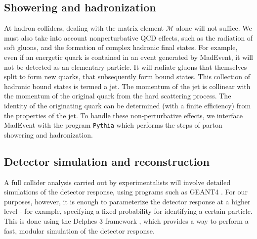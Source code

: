 \subsection{Showering and hadronization}
At hadron colliders, dealing with the matrix element $\mathcal{M}$ alone will not suffice. We must also take into account nonperturbative QCD effects, such as the radiation of soft gluons, and the formation of complex hadronic final states. For example, even if an energetic quark is contained in an event generated by MadEvent, it will not be detected as an elementary particle. It will radiate gluons that themselves split to form new quarks, that subsequently form bound states. This collection of hadronic bound states is termed a jet. The momentum of the jet is collinear with the momentum of the original quark from the hard scattering process. The identity of the originating quark can be determined (with a finite efficiency) from the properties of the jet. To handle these non-perturbative effects, we interface MadEvent with the program \texttt{Pythia}\citep{Sjostrand2006} which performs the steps of parton showering and hadronization.
\subsection{Detector simulation and reconstruction}
A full collider analysis carried out by experimentalists will involve detailed simulations of the detector response, using programs such as GEANT4 \citep{Agostinelli2003}. For our purposes, however, it is enough to parameterize the detector response at a higher level - for example, specifying a fixed probability for identifying a certain particle. This is done using the Delphes 3 framework \citep{DeFavereau2014a}, which provides a way to perform a fast, modular simulation of the detector response. 
